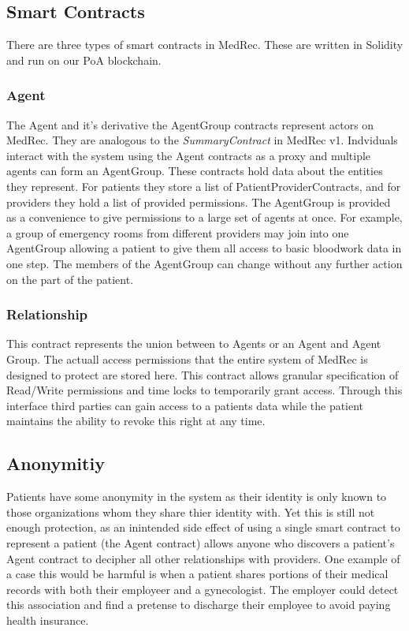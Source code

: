 \documentclass[a4paper]{article}
\begin{document}
\subsection{Smart Contracts}

There are three types of smart contracts in MedRec. These are written in Solidity and run on our PoA blockchain.

\subsubsection{Agent}

The Agent and it's derivative the AgentGroup contracts represent actors on MedRec. They are analogous to the \textit{SummaryContract} in MedRec v1. Indviduals interact with the system using the Agent contracts as a proxy and multiple agents can form an AgentGroup. These contracts hold data about the entities they represent. For patients they store a list of PatientProviderContracts, and for providers they hold a list of provided permissions. The AgentGroup is provided as a convenience to give permissions to a large set of agents at once. For example, a group of emergency rooms from different providers may join into one AgentGroup allowing a patient to give them all access to basic bloodwork data in one step. The members of the AgentGroup can change without any further action on the part of the patient.

\subsubsection{Relationship}

This contract represents the union between to Agents or an Agent and Agent Group. The actuall access permissions that the entire system of MedRec is designed to protect are stored here. This contract allows granular specification of Read/Write permissions and time locks to temporarily grant access. Through this interface third parties can gain access to a patients data while the patient maintains the ability to revoke this right at any time.

\subsection{Anonymitiy}

Patients have some anonymity in the system as their identity is only known to those organizations whom they share thier identity with. Yet this is still not enough protection, as an inintended side effect of using a single smart contract to represent a patient (the Agent contract) allows anyone who discovers a patient's Agent contract to decipher all other relationships with providers. One example of a case this would be harmful is when a patient shares portions of their medical records with both their employeer and a gynecologist. The employer could detect this association and find a pretense to discharge their employee to avoid paying health insurance.
\end{document}
